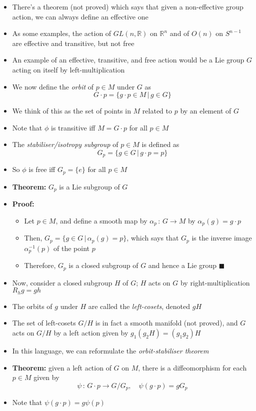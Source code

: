 \documentclass[12pt,a4paper]{article}
\numberwithin{equation}{section}
\begin{document}
\begin{itemize}
\begin{itemize}
		\end{itemize}
		\item There's a theorem (not proved) which says that given a non-effective group action, we can always define an effective one
		\item As some examples, the action of $GL(n,\mathbb{R})$ on $\mathbb{R}^{n}$ and of $O(n)$ on $S^{n-1}$ are effective and transitive, but not free
		\item An example of an effective, transitive, and free action would be a Lie group $G$ acting on itself by left-multiplication
		\item We now define the \textit{orbit} of $p\in M$ under $G$ as
		\begin{equation}
			G\cdot p=\{g\cdot p\in M\,|\,g\in G\}
		\end{equation}
		\item We think of this as the set of points in $M$ related to $p$ by an element of $G$
		\item Note that $\phi$ is transitive iff $M=G\cdot p$ for all $p\in M$
		\item The \textit{stabiliser/isotropy subgroup} of $p\in M$ is defined as
		\begin{equation}
			G_{p}=\{g\in G\,|\,g\cdot p = p\}
		\end{equation}
		\item So $\phi$ is free iff $G_{p}=\{e\}$ for all $p\in M$
		\item \textbf{Theorem:} $G_{p}$ is a Lie subgroup of $G$
		\item \textbf{Proof:}
		\begin{itemize}
			\item Let $p\in M$, and define a smooth map by $\alpha_{p}\,:\,G\to M$ by $\alpha_{p}(g)=g\cdot p$
			\item Then, $G_{p}=\{g\in G\,|\,\alpha_{p}(g)=p\}$, which says that $G_{p}$ is the inverse image $\alpha^{-1}_{p}(p)$ of the point $p$
			\item Therefore, $G_{p}$ is a closed subgroup of $G$ and hence a Lie group $\blacksquare$
		\end{itemize}
		\item Now, consider a closed subgroup $H$ of $G$; $H$ acts on $G$ by right-multiplication $R_{h}g=gh$
		\item The orbits of $g$ under $H$ are called the \textit{left-cosets}, denoted $gH$
		\item The set of left-cosets $G/H$ is in fact a smooth manifold (not proved), and $G$ acts on $G/H$ by a left action given by $g_{1}(g_{2}H)=(g_{1}g_{2})H$
		\item In this language, we can reformulate the \textit{orbit-stabiliser theorem}
		\item \textbf{Theorem:} given a left action of $G$ on $M$, there is a diffeomorphism for each $p\in M$ given by
		\begin{equation}
			\psi\,:\,G\cdot p\to G/G_{p},\quad \psi(g\cdot p)=gG_{p}
		\end{equation}
		\item Note that $\psi(g\cdot p)=g\psi(p)$
	\end{itemize}
	\newpage
\end{document}
